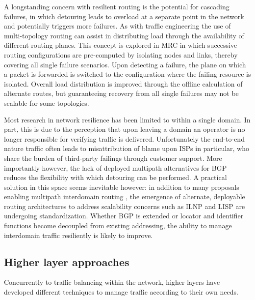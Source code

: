 A longstanding concern with resilient routing is the potential for cascading failures, in which detouring leads to overload at a separate point in the network and potentially triggers more failures.
As with traffic engineering the use of multi-topology routing can assist in distributing load through the availability of different routing planes.
This concept is explored in \ac{MRC} in which successive routing configurations are pre-computed by isolating nodes and links, thereby covering all single failure scenarios.
Upon detecting a failure, the plane on which a packet is forwarded is switched to the configuration where the failing resource is isolated.
Overall load distribution is improved through the offline calculation of alternate routes, but guaranteeing recovery from all single failures may not be scalable for some topologies.

Most research in network resilience has been limited to within a single domain.
In part, this is due to the perception that upon leaving a domain an operator is no longer responsible for verifying traffic is delivered.
Unfortunately the end-to-end nature traffic often leads to misattribution of blame upon \acp{ISP} in particular, who share the burden of third-party failings through customer support.
More importantly however, the lack of deployed multipath alternatives for \ac{BGP} reduces the flexibility with which detouring can be performed.
A practical solution in this space seems inevitable however: in addition to many proposals enabling multipath interdomain routing \cite{Yang:2003p136,Xu:2006p249,Motiwala:2008p107,Godfrey:2009p36}, the emergence of alternate, deployable routing architectures to address scalability concerns such as \ac{ILNP} \cite{Atkinson:2009p525} and \ac{LISP} \cite{Lewis:2012p523} are undergoing standardization.  
Whether \ac{BGP} is extended or locator and identifier functions become decoupled from existing addressing, the ability to manage interdomain traffic resiliently is likely to improve.

\subsection{Higher layer approaches}

Concurrently to traffic balancing within the network, higher layers have developed different techniques to manage traffic according to their own needs.

